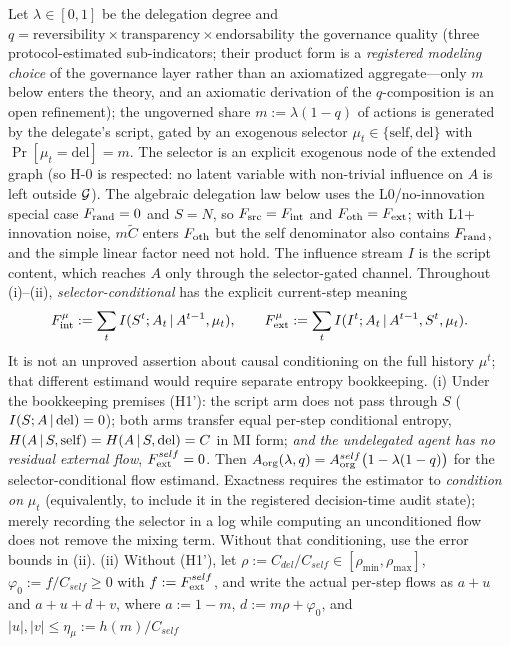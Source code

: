 \begin{theorem}\label{thm:t7}
Let $\lambda\in[0,1]$ be the delegation degree and
$q=\text{reversibility}\times\text{transparency}\times\text{endorsability}$
the governance quality (three protocol-estimated sub-indicators; their product
form is a \emph{registered modeling choice} of the governance layer rather
than an axiomatized aggregate---only $m$ below enters the theory, and an
axiomatic derivation of the $q$-composition is an open refinement); the
ungoverned share $m:=\lambda(1-q)$ of actions is
generated by the delegate's script, gated by an exogenous selector
$\mu_t\in\{\mathrm{self},\mathrm{del}\}$ with $\Pr[\mu_t=\mathrm{del}]=m$.
The selector is an explicit exogenous node of the extended graph (so H-0 is
respected: no latent variable with non-trivial influence on $A$ is left
outside $\mathcal{G}$). The algebraic delegation law below uses the L0/no-innovation
special case $F_{\mathrm{rand}}=0$ and $S=N$, so $F_{\mathrm{src}}=F_{\mathrm{int}}$ and $F_{\mathrm{oth}}=F_{\mathrm{ext}}$; with
L1+ innovation noise, $m\tilde C$ enters $F_{\mathrm{oth}}$ but the self denominator also
contains $F_{\mathrm{rand}}$, and the simple linear factor need not hold. The influence
stream $I$ is the script content, which
reaches $A$ only through the selector-gated channel. Throughout (i)--(ii),
\emph{selector-conditional} has the explicit current-step meaning
\[
F_{\mathrm{int}}^{\mu}:=\sum_t I(S^t;A_t\,|\, A^{t-1},\mu_t),\qquad
F_{\mathrm{ext}}^{\mu}:=\sum_t I(I^t;A_t\,|\, A^{t-1},S^t,\mu_t).
\]
It is not an unproved assertion about causal conditioning on the full history
$\mu^t$; that different estimand would require separate entropy bookkeeping.
\textup{(i)} Under the bookkeeping premises \textup{(H1')}: the script arm
does not pass through $S$ ($I(S;A\,|\,\mathrm{del})=0$); both arms transfer
equal per-step conditional entropy, $H(A\,|\, S,\mathrm{self})=H(A\,|\,
S,\mathrm{del})=C$ in MI form; \emph{and the undelegated agent has no residual
external flow}, $F_{\mathrm{ext}}^{self}=0$. Then
$A_{\mathrm{org}}(\lambda,q)=A_{\mathrm{org}}^{self}\bigl(1-\lambda(1-q)\bigr)$ for the
selector-conditional flow estimand. Exactness requires the estimator to
\emph{condition on} $\mu_t$ (equivalently, to include it in the registered
decision-time audit state); merely recording the selector in a log while
computing an unconditioned flow does not remove the mixing term. Without
that conditioning, use the error bounds in \textup{(ii)}.
\textup{(ii)} Without \textup{(H1')}, let
$\rho:=C_{del}/C_{self}\in[\rho_{\min},\rho_{\max}]$,
$\varphi_0:=f/C_{self}\ge0$ with $f:=F_{\mathrm{ext}}^{self}$, and write the actual
per-step flows as $a+u$ and $a+u+d+v$, where
$a:=1-m$, $d:=m\rho+\varphi_0$, and $|u|,|v|\le\eta_\mu:=h(m)/C_{self}$

\end{theorem}
